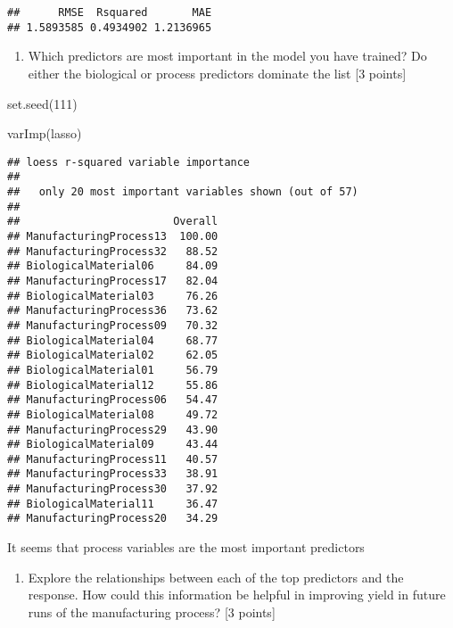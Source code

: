 \documentclass[
]{article}
\newenvironment{Shaded}{\begin{snugshade}}{\end{snugshade}}
\newcommand{\DecValTok}[1]{\textcolor[rgb]{0.00,0.00,0.81}{#1}}
\newcommand{\FunctionTok}[1]{\textcolor[rgb]{0.00,0.00,0.00}{#1}}
\newcommand{\NormalTok}[1]{#1}
\providecommand{\tightlist}{%
  \setlength{\itemsep}{0pt}\setlength{\parskip}{0pt}}
\begin{document}
\begin{verbatim}
##      RMSE  Rsquared       MAE 
## 1.5893585 0.4934902 1.2136965
\end{verbatim}

\begin{enumerate}
\def\labelenumi{(\alph{enumi})}
\setcounter{enumi}{3}
\tightlist
\item
  Which predictors are most important in the model you have trained? Do
  either the biological or process predictors dominate the list {[}3
  points{]}
\end{enumerate}

\begin{Shaded}
\begin{Highlighting}[]
\FunctionTok{set.seed}\NormalTok{(}\DecValTok{111}\NormalTok{)}

\FunctionTok{varImp}\NormalTok{(lasso)}
\end{Highlighting}
\end{Shaded}

\begin{verbatim}
## loess r-squared variable importance
## 
##   only 20 most important variables shown (out of 57)
## 
##                        Overall
## ManufacturingProcess13  100.00
## ManufacturingProcess32   88.52
## BiologicalMaterial06     84.09
## ManufacturingProcess17   82.04
## BiologicalMaterial03     76.26
## ManufacturingProcess36   73.62
## ManufacturingProcess09   70.32
## BiologicalMaterial04     68.77
## BiologicalMaterial02     62.05
## BiologicalMaterial01     56.79
## BiologicalMaterial12     55.86
## ManufacturingProcess06   54.47
## BiologicalMaterial08     49.72
## ManufacturingProcess29   43.90
## BiologicalMaterial09     43.44
## ManufacturingProcess11   40.57
## ManufacturingProcess33   38.91
## ManufacturingProcess30   37.92
## BiologicalMaterial11     36.47
## ManufacturingProcess20   34.29
\end{verbatim}

It seems that process variables are the most important predictors

\begin{enumerate}
\def\labelenumi{(\alph{enumi})}
\setcounter{enumi}{4}
\tightlist
\item
  Explore the relationships between each of the top predictors and the
  response. How could this information be helpful in improving yield in
  future runs of the manufacturing process? {[}3 points{]}
\end{enumerate}
\end{document}
